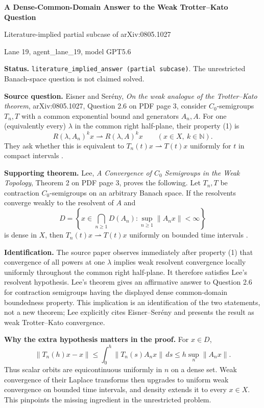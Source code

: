 \documentclass[11pt]{article}
\newcommand{\N}{\mathbb N}
\begin{document}
\begin{center}
{\Large\bfseries A Dense-Common-Domain Answer to the Weak Trotter--Kato Question}

\medskip
{\large Literature-implied partial subcase of arXiv:0805.1027}

\smallskip
Lane 19, agent\_lane\_19, model GPT5.6
\end{center}

\textbf{Status.} \texttt{literature\_implied\_answer (partial subcase)}.
The unrestricted Banach-space question is not claimed solved.

\textbf{Source question.} Eisner and Ser\'eny, \emph{On the weak analogue of
the Trotter--Kato theorem}, arXiv:0805.1027, Question 2.6 on PDF page 3, consider
$C_0$-semigroups $T_n,T$ with a common exponential bound and generators
$A_n,A$.  For one (equivalently every) $\lambda$ in the common right
half-plane, their property (1) is
\[
 R(\lambda,A_n)^k x \rightharpoonup R(\lambda,A)^k x
 \qquad(x\in X,\ k\in\N).
\]
They ask whether this is equivalent to $T_n(t)x\rightharpoonup T(t)x$
uniformly for $t$ in compact intervals \cite{ES}.

\textbf{Supporting theorem.} Lee, \emph{A Convergence of $C_0$ Semigroups in
the Weak Topology}, Theorem 2 on PDF page 3, proves the following.  Let
$T_n,T$ be contraction $C_0$-semigroups on an arbitrary Banach space.  If the
resolvents converge weakly to the resolvent of $A$ and
\[
 D=\left\{x\in\bigcap_{n\ge1}D(A_n):
       \sup_{n\ge1}\lVert A_nx\rVert<\infty\right\}
\]
is dense in $X$, then $T_n(t)x\rightharpoonup T(t)x$ uniformly on bounded
time intervals \cite[Theorem 2]{Lee2014}.

\textbf{Identification.} The source paper observes immediately after
property (1) that convergence of all powers at one $\lambda$ implies weak
resolvent convergence locally uniformly throughout the common right
half-plane.  It therefore satisfies Lee's resolvent hypothesis.  Lee's theorem
gives an affirmative answer to Question 2.6 for contraction semigroups having
the displayed dense common-domain boundedness property.  This implication is
an identification of the two statements, not a new theorem; Lee explicitly
cites Eisner--Ser\'eny and presents the result as weak Trotter--Kato
convergence.

\textbf{Why the extra hypothesis matters in the proof.} For $x\in D$,
\[
 \lVert T_n(h)x-x\rVert
 \le \int_0^h\lVert T_n(s)A_nx\rVert\,ds
 \le h\sup_n\lVert A_nx\rVert .
\]
Thus scalar orbits are equicontinuous uniformly in $n$ on a dense set.
Weak convergence of their Laplace transforms then upgrades to uniform weak
convergence on bounded time intervals, and density extends it to every
$x\in X$.  This pinpoints the missing ingredient in the unrestricted problem.
\end{document}
